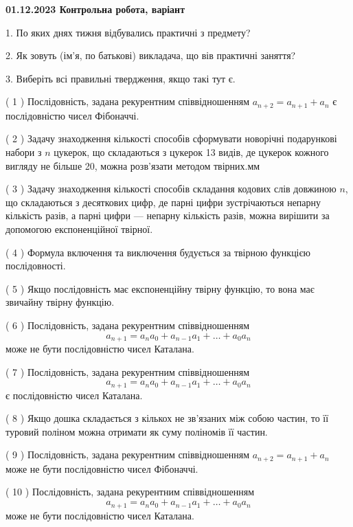 \documentclass[12pt, ukrainian]{article}
\begin{document}
\vspace{4mm}
\newpage
\begin {large}

\textbf{01.12.2023 Контрольна робота, варіант  }\par


{
1. По яких днях тижня відбувались практичні з предмету?



\vspace{5mm}
2. Як зовуть (ім'я, по батькові) викладача, що вів практичні заняття?



\vspace{5mm}
3. Виберіть всі правильні твердження, якщо такі тут є.\par
\vspace{2mm}
( 1 ) Послідовність, задана рекурентним співвідношенням $a_{n+2}=a_{n+1}+a_{n}$ є послідовністю чисел Фібоначчі.%

( 2 ) Задачу знаходження кількості способів сформувати новорічні подарункові набори з $n$ цукерок, що складаються з цукерок 13 видів, де цукерок кожного вигляду не більше 20, можна розв’язати методом твірних.мм%

( 3 ) Задачу знаходження кількості способів складання кодових слів довжиною $n$, що складаються з десяткових цифр, де парні цифри зустрічаються непарну кількість разів, а парні цифри — непарну кількість разів, можна вирішити за допомогою експоненційної твірної.%

( 4 ) Формула включення та виключення будується за твірною функцією послідовності.%

( 5 ) Якщо послідовність має експоненційну твірну функцію, то вона має звичайну твірну функцію.%

( 6 ) Послідовність, задана рекурентним співвідношенням $$a_{n+1}=a_{n}a_{0}+a_{n-1}a_{1}+\ldots+a_0a_{n}$$ може не бути послідовністю чисел Каталана.%

( 7 ) Послідовність, задана рекурентним співвідношенням $$a_{n+1}=a_{n}a_{0}+a_{n-1}a_{1}+\ldots+a_0a_{n}$$ є послідовністю чисел Каталана.%

( 8 ) Якщо дошка складається з кількох не зв’язаних між собою частин, то її туровий поліном можна отримати як суму поліномів її частин.%

( 9 ) Послідовність, задана рекурентним співвідношенням $a_{n+2}=a_{n+1}+a_{n}$ може не бути послідовністю чисел Фібоначчі.%

( 10 ) Послідовність, задана рекурентним співвідношенням $$a_{n+1}=a_{n}a_{0}+a_{n-1}a_{1}+\ldots+a_0a_{n}$$ може не бути послідовністю чисел Каталана.%
}
\end {large}
\end{document}

